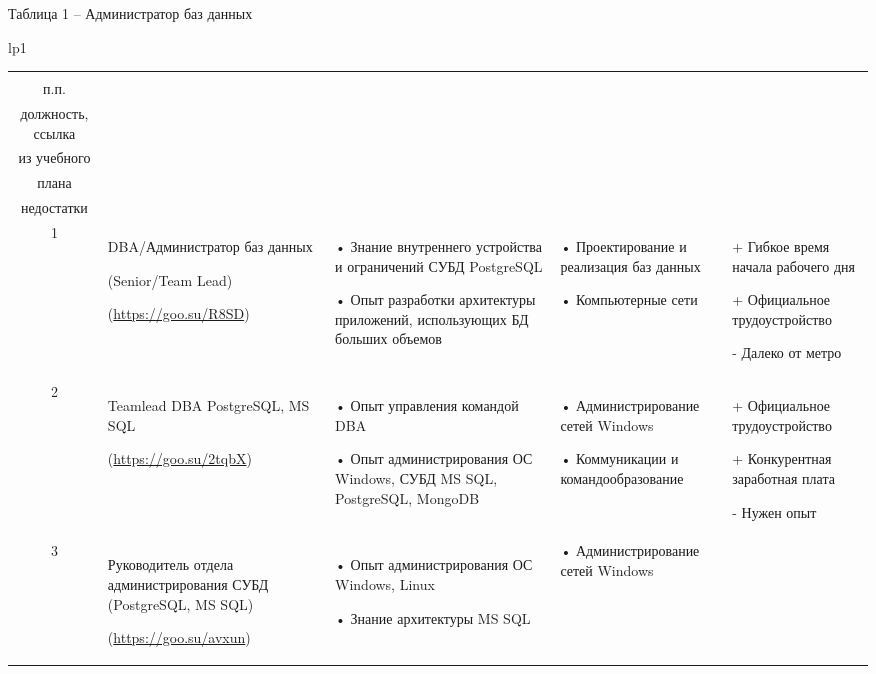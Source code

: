 \documentclass[14pt]{extreport}
\begin{document}
\begin{landscape}
Таблица 1 – Администратор баз данных
\begin{longtable}[H]{lp{1\linewidth}}
\caption{Администратор баз данных \label{table1}}


\centering

\begin{small}


    \begin{tabular}{|c|p{}|p{6cm}|p{5cm}|p{5cm}|}
	\hline 
	\makecell{№ \\ п.п.} &	\makecell{Наименование,\\ должность, ссылка} &	\makecell{Требования} & 	\makecell{Дисциплины \\ из учебного \\плана} &	\makecell{Преимущества и \\недостатки}  \\ 
	\hline 
	1	& DBA/Администратор баз данных 
	
	(Senior/Team Lead)
	
(\url{https://goo.su/R8SD}) & •	Знание внутреннего устройства и ограничений СУБД PostgreSQL 

•	Опыт разработки архитектуры приложений, использующих БД больших объемов

 &	•	Проектирование и реализация баз данных
 
•	Компьютерные сети
 & + Гибкое время начала рабочего дня

+ Официальное трудоустройство 

- Далеко от метро\\
	\hline
	2 & Teamlead DBA PostgreSQL, MS SQL
	
(\url{https://goo.su/2tqbX})
& •	Опыт управления командой DBA 

•	Опыт администрирования ОС Windows, СУБД MS SQL, PostgreSQL, MongoDB
&
•	Администрирование сетей Windows

•	Коммуникации и командообразование
&+	Официальное трудоустройство 

+	Конкурентная заработная плата

-	Нужен опыт\\


	\hline
	3 & Руководитель отдела администрирования СУБД (PostgreSQL, MS SQL)
	
(\url{https://goo.su/avxun}) &
•	Опыт администрирования ОС Windows, Linux

•	Знание архитектуры MS SQL
&
•	Администрирование сетей Windows


\end{tabular}
\end{small}
\end{longtable}
\end{landscape}
\end{document}
